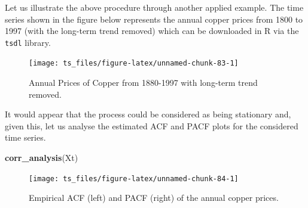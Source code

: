 \documentclass[]{book}
\newenvironment{Shaded}{\begin{snugshade}}{\end{snugshade}}
\newcommand{\KeywordTok}[1]{\textcolor[rgb]{0.13,0.29,0.53}{\textbf{#1}}}
\newcommand{\DataTypeTok}[1]{\textcolor[rgb]{0.13,0.29,0.53}{#1}}
\newcommand{\DecValTok}[1]{\textcolor[rgb]{0.00,0.00,0.81}{#1}}
\newcommand{\StringTok}[1]{\textcolor[rgb]{0.31,0.60,0.02}{#1}}
\newcommand{\OperatorTok}[1]{\textcolor[rgb]{0.81,0.36,0.00}{\textbf{#1}}}
\newcommand{\NormalTok}[1]{#1}
\theoremstyle{definition}
\theoremstyle{definition}
\theoremstyle{definition}
\theoremstyle{remark}
\begin{document}
Let us illustrate the above procedure through another applied example.
The time series shown in the figure below represents the annual copper
prices from 1800 to 1997 (with the long-term trend removed) which can be
downloaded in R via the \texttt{tsdl} library.

\begin{Shaded}
\end{Shaded}

\begin{figure}

{\centering \texttt{[image: ts\_files/figure-latex/unnamed-chunk-83-1]} 

}

\caption{Annual Prices of Copper from 1880-1997 with long-term trend removed.}\label{fig:unnamed-chunk-83}
\end{figure}

It would appear that the process could be considered as being stationary
and, given this, let us analyse the estimated ACF and PACF plots for the
considered time series.

\begin{Shaded}
\begin{Highlighting}[]
\KeywordTok{corr_analysis}\NormalTok{(Xt)}
\end{Highlighting}
\end{Shaded}

\begin{figure}

{\centering \texttt{[image: ts\_files/figure-latex/unnamed-chunk-84-1]} 

}

\caption{Empirical ACF (left) and PACF (right) of the annual copper prices.}\label{fig:unnamed-chunk-84}
\end{figure}
\end{document}

